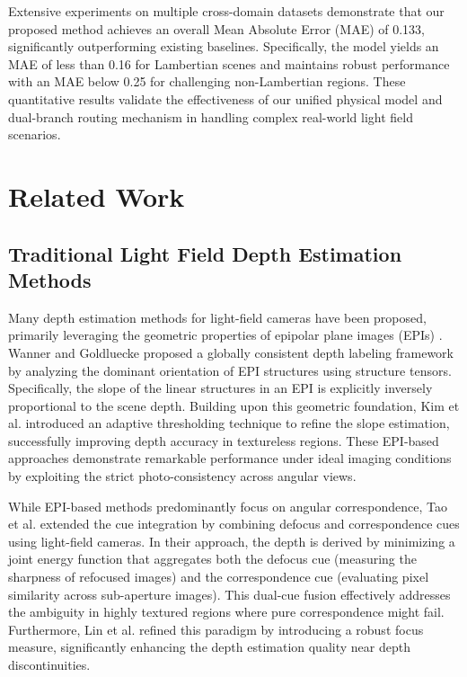 \documentclass[lettersize,journal]{IEEEtran}
\begin{document}
Extensive experiments on multiple cross-domain datasets demonstrate that our proposed method achieves an overall Mean Absolute Error (MAE) of 0.133, significantly outperforming existing baselines. Specifically, the model yields an MAE of less than 0.16 for Lambertian scenes and maintains robust performance with an MAE below 0.25 for challenging non-Lambertian regions. These quantitative results validate the effectiveness of our unified physical model and dual-branch routing mechanism in handling complex real-world light field scenarios.


\section{Related Work}

\subsection{Traditional Light Field Depth Estimation Methods}

Many depth estimation methods for light-field cameras have been proposed, primarily leveraging the geometric properties of epipolar plane images (EPIs) \cite{epipolarplaneimagelightfie}. Wanner and Goldluecke \cite{WannerGoldluecke} proposed a globally consistent depth labeling framework by analyzing the dominant orientation of EPI structures using structure tensors. Specifically, the slope of the linear structures in an EPI is explicitly inversely proportional to the scene depth. Building upon this geometric foundation, Kim et al. \cite{KimEPI} introduced an adaptive thresholding technique to refine the slope estimation, successfully improving depth accuracy in textureless regions. These EPI-based approaches demonstrate remarkable performance under ideal imaging conditions by exploiting the strict photo-consistency across angular views.

While EPI-based methods predominantly focus on angular correspondence, Tao et al. \cite{Taodefocusandcorrespondence} extended the cue integration by combining defocus and correspondence cues using light-field cameras. In their approach, the depth is derived by minimizing a joint energy function that aggregates both the defocus cue (measuring the sharpness of refocused images) and the correspondence cue (evaluating pixel similarity across sub-aperture images). This dual-cue fusion effectively addresses the ambiguity in highly textured regions where pure correspondence might fail. Furthermore, Lin et al. \cite{Lindefocus} refined this paradigm by introducing a robust focus measure, significantly enhancing the depth estimation quality near depth discontinuities.
\end{document}
